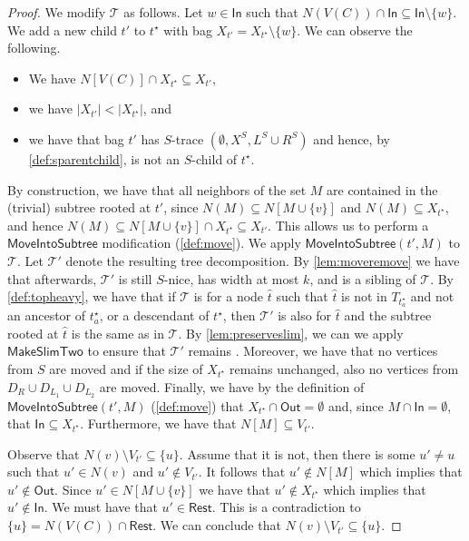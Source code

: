 \documentclass[a4paper,UKenglish,cleveref, autoref, thm-restate, numberwithinsect]{lipics-v2021}
\newcounter{modification}
\newcommand{\slim}{\text{slim}\xspace}
\newcommand{\topheavy}{\text{top-heavy}\xspace}
\newcommand{\In}{\mathsf{In}}
\newcommand{\Out}{\mathsf{Out}}
\newcommand{\Rest}{\mathsf{Rest}}
\newcommand{\MoveIntoSubtree}{\mathsf{MoveIntoSubtree}}
\newcommand{\MakeSlimTwo}{\mathsf{MakeSlimTwo}}
\begin{document}
\begin{proof}
        We modify $\mathcal{T}$ as follows. Let $w\in \In$ such that $N(V(C))\cap \In\subseteq \In\setminus \{w\}$. We add a new child $t'$ to ${t^\star}$ with bag $X_{t'}=X_{t^\star}\setminus\{w\}$. We can observe the following.
        \begin{itemize}
            \item We have $N[V(C)]\cap X_{t^\star}\subseteq X_{t'}$,
            \item we have $|X_{t'}|<|X_{t^\star}|$, and
            \item we have that bag $t'$ has $S$-trace $(\emptyset,X^S,L^S\cup R^S)$ and hence, by \cref{def:sparentchild}, is not an $S$-child of ${t^\star}$.
        \end{itemize}
          By construction, we have that all neighbors of the set $M$ are contained in the (trivial) subtree rooted at $t'$, since $N(M)\subseteq N[M\cup\{v\}]$ and $N(M)\subseteq X_{t^\star}$, and hence $N(M)\subseteq N[M\cup\{v\}]\cap X_{t^\star}\subseteq X_{t'}$.
        This allows us to perform a $\MoveIntoSubtree$ modification (\cref{def:move}). We apply $\MoveIntoSubtree(t',M)$ to $\mathcal{T}$. Let $\mathcal{T}'$ denote the resulting tree decomposition.
By \cref{lem:moveremove} we have that afterwards, 
$\mathcal{T}'$ is still $S$-nice, has width at most $k$, and is a sibling of $\mathcal{T}$. 
        By \cref{def:topheavy}, we have that
        if $\mathcal{T}$ is \topheavy for a node $\hat{t}$ such that $\hat{t}$ is not in $T_{t^\star_a}$ and not an ancestor of $t^\star_a$, or
         a descendant of $t^\star$,
then $\mathcal{T}'$ is also \topheavy for $\hat{t}$ and the subtree rooted at $\hat{t}$ is the same as in $\mathcal{T}$.
By \cref{lem:preserveslim}, we can we apply $\MakeSlimTwo$ to ensure that $\mathcal{T}'$ remains \slim.
Moreover, we have that no vertices from $S$ are moved and if the size of $X_{t^\star}$ remains unchanged, also no vertices from $D_R\cup D_{L_1}\cup D_{L_2}$ are moved.
Finally, we have by the definition of $\MoveIntoSubtree(t',M)$ (\cref{def:move}) that $X_{t^\star}\cap \Out=\emptyset$ and, since $M\cap \In=\emptyset$, that $\In\subseteq X_{t^\star}$. Furthermore, we have that $N[M]\subseteq V_{t'}$.         
        
        
        
        
        Observe that $N(v)\setminus V_{t'}\subseteq \{u\}$. Assume that it is not, then there is some $u'\neq u$ such that $u'\in N(v)$ and $u'\notin V_{t'}$. It follows that $u'\notin N[M]$ which implies that $u'\notin \Out$. Since $u'\in N[M\cup\{v\}]$ we have that $u'\notin X_{t^\star}$ which implies that $u'\notin \In$. We must have that $u'\in\Rest$. This is a contradiction to $\{u\}=N(V(C))\cap \Rest$.
We can conclude that $N(v)\setminus V_{t'}\subseteq \{u\}$.


\end{proof}
\end{document}
